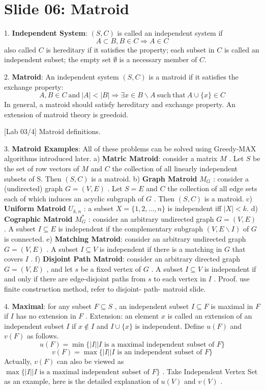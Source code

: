 \documentclass[10pt,a4paper]{article}
\begin{document}
\section*{Slide 06: Matroid}

1. \textbf{Independent System}: \((S,C)\) is called an independent system if
\[
A\subset B,B\in C\Longrightarrow A\in C
\]
also called \(C\) is hereditary if it satisfies the property; each subset in \(C\) is called an independent subset; the empty set \(\emptyset\) is a necessary member of \(C\).

2. \textbf{Matroid}: An independent system \((S,C)\) is a matroid if it satisfies the exchange property:
\[
A,B\in C\mathrm{~and~}|A|< |B|\Longrightarrow \exists x\in B\backslash A\mathrm{~such~that~}A\cup \{x\} \in C
\]
In general, a matroid should satisfy hereditary and exchange property. An extension of matroid theory is greedoid.

[Lab 03/4] Matroid definitions.

3. \textbf{Matroid Examples}: All of these problems can be solved using Greedy-MAX algorithms introduced later.
a) \textbf{Matric Matroid}: consider a matrix \(M\) . Let \(S\) be the set of row vectors of \(M\) and \(C\) the collection of all linearly independent subsets of S. Then \((S,C)\) is a matroid.
b) \textbf{Graph Matroid} \(M_{G}\) : consider a (undirected) graph \(G = (V,E)\) . Let \(S = E\) and \(C\) the collection of all edge sets each of which induces an acyclic subgraph of \(G\) . Then \((S,C)\) is a matroid.
c) \textbf{Uniform Matroid} \(U_{k,n}\) : a subset \(X = \{1,2,\ldots ,n\}\) is independent iff \(|X|< k\).
d) \textbf{Cographic Matroid} \(M_{G}^{*}\) : consider an arbitrary undirected graph \(G = (V,E)\) . A subset \(I\subseteq E\) is independent if the complementary subgraph \((V,E\backslash I)\) of \(G\) is connected.
e) \textbf{Matching Matroid}: consider an arbitrary undirected graph \(G = (V,E)\) . A subset \(I\subseteq V\) is independent if there is a matching in \(G\) that covers \(I\) .
f) \textbf{Disjoint Path Matroid}: consider an arbitrary directed graph \(G = (V,E)\) , and let \(s\) be a fixed vertex of \(G\) . A subset \(I\subseteq V\) is independent if and only if there are edge-disjoint paths from \(s\) to each vertex in \(I\) .
Proof. use finite construction method, refer to disjoint- path- matroid slide.

4. \textbf{Maximal}: for any subset \(F\subseteq S\) , an independent subset \(I\subseteq F\) is maximal in \(F\) if \(I\) has no extension in \(F\) .
Extension: an element \(x\) is called an extension of an independent subset \(I\) if \(x\notin I\) and \(I\cup \{x\}\) is independent.
Define \(u(F)\) and \(v(F)\) as follows.
\[
u(F) = \min \{|I| | I \text{ is a maximal independent subset of } F\}
\]
\[
v(F) = \max \{|I| | I \text{ is an independent subset of } F\}
\]
Actually, \(v(F)\) can also be viewed as \(\max \{|I| | I \text{ is a maximal independent subset of } F\}\) .
Take Independent Vertex Set as an example, here is the detailed explanation of \(u(V)\) and \(v(V)\) .
\end{document}
